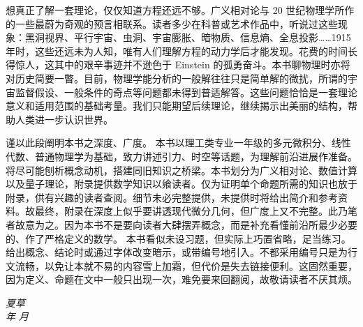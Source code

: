 想真正了解一套理论，仅仅知道方程还远不够。广义相对论与 20 世纪物理学所作的一些最蔚为奇观的预言相联系。读者多少在科普或艺术作品中，听说过这些现象：黑洞视界、平行宇宙、虫洞、宇宙膨胀、暗物质、信息熵、全息投影……1915 年时，这些还远未为人知，唯有人们理解方程的动力学后才能发现。花费的时间长得惊人，这其中的艰辛事迹并不逊色于 Einstein 的孤勇奋斗。本书聊物理时亦将对历史简要一瞥。目前，物理学能分析的一般解往往只是简单解的微扰，所谓的宇宙监督假设、一般条件的奇点等问题都未得到普适解答。这些问题恰恰是一套理论意义和适用范围的基础考量。我们只能期望后续理论，继续揭示出美丽的结构，帮助人类进一步认识世界。

谨以此段阐明本书之深度、广度。
本书以理工类专业一年级的多元微积分、线性代数、普通物理学为基础，致力讲述引力、时空等话题，为理解前沿进展作准备。将尽可能刨析概念动机，搭建同旧知识之桥梁。本书划分为广义相对论、数值计算以及量子理论，附录提供数学知识以飨读者。仅为证明单个命题所需的知识也放于附录，供有兴趣的读者查阅。细节未必完整提供，未提供时将给出简介和参考资料。故最终，附录在深度上似乎要讲透现代微分几何，但广度上又不完整。此乃笔者故意为之。因为本书不是要向读者大肆摆弄概念，而是补充看懂前沿所最少必要的、作了严格定义的数学。
本书看似未设习题，但实际上巧置省略，足当练习。
给出概念、结论时或通过字体改变暗示，或带编号地引入。不都采用编号只是为行文流畅，以免让本就不易的内容雪上加霜，但代价是失去链接便利。这固然重要，因为定义、命题在文中一般只出现一次，难免要来回翻阅，故敬请读者不厌其烦。

\begin{flushright}
\textit{夏草}\\
\textit{\the\year 年 \the\month 月}
\end{flushright}
\label{preface}